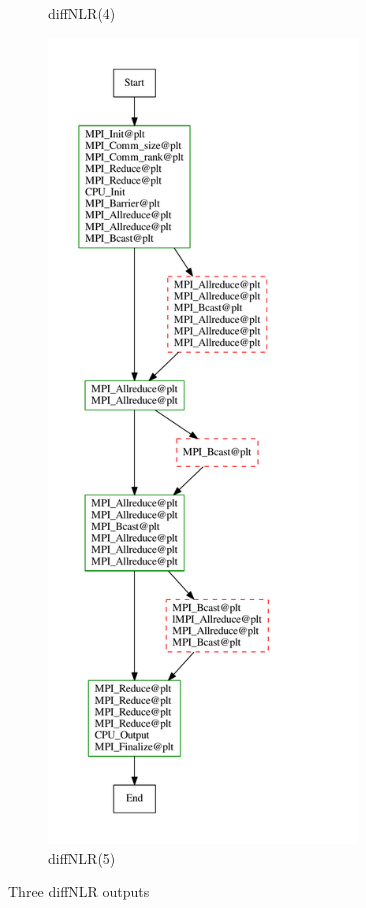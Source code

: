 \begin{figure}
\begin{subfigure}[b]{0.31\textwidth}
\caption{diffNLR(4)}
\label{diffNLR-0}
     \end{subfigure}
     \hfill
     \begin{subfigure}[b]{0.31\textwidth}
         \centering
\includegraphics[width=0.9\textwidth]{figs/diffNLR/mpiBug2-0-nn-x0.pdf}
\caption{diffNLR(5)}
\label{diffNLR-5}
     \end{subfigure}
        \caption{Three diffNLR outputs}
        \label{fig:three graphs}
\end{figure}

